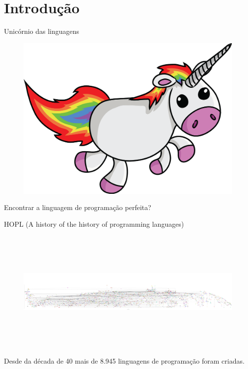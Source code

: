 \section{Introdução}

\begin{frame}[fragile]{Unicórnio das linguagens}
\begin{figure}[ht!]
  \centering
  \includegraphics[scale=0.19]{images/unicorn.png}
\end{figure}
\begin{center}
\small{Encontrar a linguagem de programação perfeita?}
\end{center}
\end{frame}

\begin{frame}[fragile]{HOPL (A history of the history of programming languages)}
\begin{figure}[ht!]
  \centering
  \includegraphics[width=\linewidth, height=6cm]{images/hopl.pdf}
\end{figure}
\small{Desde da década de 40 mais de 8.945 linguagens de programação foram criadas.}
\end{frame}